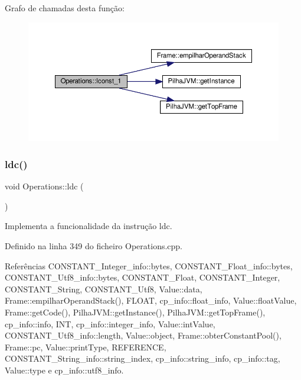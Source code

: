 Grafo de chamadas desta função\+:\nopagebreak
\begin{figure}[H]
\begin{center}
\leavevmode
\includegraphics[width=350pt]{classOperations_ae6c6a8e3d75dec712e534434f85909ce_cgraph}
\end{center}
\end{figure}
\mbox{\label{classOperations_aa9a87c1ef4605d0b7b7a99c8d9bc693c}} 
\subsubsection{\texorpdfstring{ldc()}{ldc()}}
{\footnotesize\ttfamily void Operations\+::ldc (\begin{DoxyParamCaption}{ }\end{DoxyParamCaption})\hspace{0.3cm}{\ttfamily [private]}}



Implementa a funcionalidade da instrução ldc. 



Definido na linha 349 do ficheiro Operations.\+cpp.



Referências C\+O\+N\+S\+T\+A\+N\+T\+\_\+\+Integer\+\_\+info\+::bytes, C\+O\+N\+S\+T\+A\+N\+T\+\_\+\+Float\+\_\+info\+::bytes, C\+O\+N\+S\+T\+A\+N\+T\+\_\+\+Utf8\+\_\+info\+::bytes, C\+O\+N\+S\+T\+A\+N\+T\+\_\+\+Float, C\+O\+N\+S\+T\+A\+N\+T\+\_\+\+Integer, C\+O\+N\+S\+T\+A\+N\+T\+\_\+\+String, C\+O\+N\+S\+T\+A\+N\+T\+\_\+\+Utf8, Value\+::data, Frame\+::empilhar\+Operand\+Stack(), F\+L\+O\+AT, cp\+\_\+info\+::float\+\_\+info, Value\+::float\+Value, Frame\+::get\+Code(), Pilha\+J\+V\+M\+::get\+Instance(), Pilha\+J\+V\+M\+::get\+Top\+Frame(), cp\+\_\+info\+::info, I\+NT, cp\+\_\+info\+::integer\+\_\+info, Value\+::int\+Value, C\+O\+N\+S\+T\+A\+N\+T\+\_\+\+Utf8\+\_\+info\+::length, Value\+::object, Frame\+::obter\+Constant\+Pool(), Frame\+::pc, Value\+::print\+Type, R\+E\+F\+E\+R\+E\+N\+CE, C\+O\+N\+S\+T\+A\+N\+T\+\_\+\+String\+\_\+info\+::string\+\_\+index, cp\+\_\+info\+::string\+\_\+info, cp\+\_\+info\+::tag, Value\+::type e cp\+\_\+info\+::utf8\+\_\+info.



